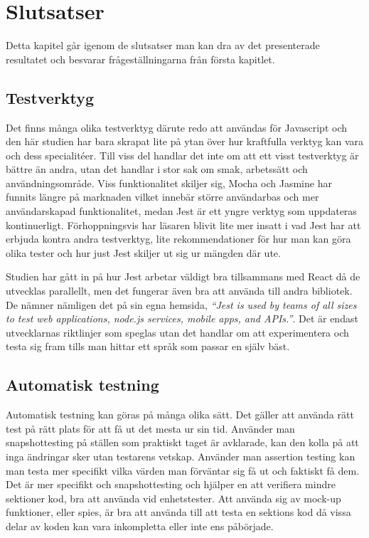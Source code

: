 \section{Slutsatser}
\label{sec:david-conclusion}
Detta kapitel går igenom de slutsatser man kan dra av det presenterade resultatet och besvarar frågeställningarna från första kapitlet.
\subsection{Testverktyg}
Det finns många olika testverktyg därute redo att användas för Javascript och den här studien har bara skrapat lite på ytan över hur kraftfulla verktyg kan vara och dess specialitéer. Till viss del handlar det inte om att ett visst testverktyg är bättre än andra, utan det handlar i stor sak om smak, arbetssätt och användningsområde. Viss funktionalitet skiljer sig, Mocha och Jasmine har funnits längre på marknaden vilket innebär större användarbas och mer användarskapad funktionalitet, medan Jest är ett yngre verktyg som uppdateras kontinuerligt. Förhoppningsvis har läsaren blivit lite mer insatt i vad Jest har att erbjuda kontra andra testverktyg, lite rekommendationer för hur man kan göra olika tester och hur just Jest skiljer ut sig ur mängden där ute. 

Studien har gått in på hur Jest arbetar väldigt bra tillsammans med React då de utvecklas parallellt, men det fungerar även bra att använda till andra bibliotek. De nämner nämligen det på sin egna hemsida, \textit{``Jest is used by teams of all sizes to test web applications, node.js services, mobile apps, and APIs.''}\cite{bib-jest}.  Det är endast utvecklarnas riktlinjer som speglas utan det handlar om att experimentera och testa sig fram tills man hittar ett språk som passar en själv bäst. 

\subsection{Automatisk testning}
Automatisk testning kan göras på många olika sätt. Det gäller att använda rätt test på rätt plats för att få ut det mesta ur sin tid. Använder man snapshottesting på ställen som praktiskt taget är avklarade, kan den kolla på att inga ändringar sker utan testarens vetskap. Använder man assertion testing kan man testa mer specifikt vilka värden man förväntar sig få ut och faktiskt få dem. Det är mer specifikt och snapshottesting och hjälper en att verifiera mindre sektioner kod, bra att använda vid enhetstester. Att använda sig av mock-up funktioner, eller spies, är bra att använda till att testa en sektions kod då vissa delar av koden kan vara inkompletta eller inte ens påbörjade. 